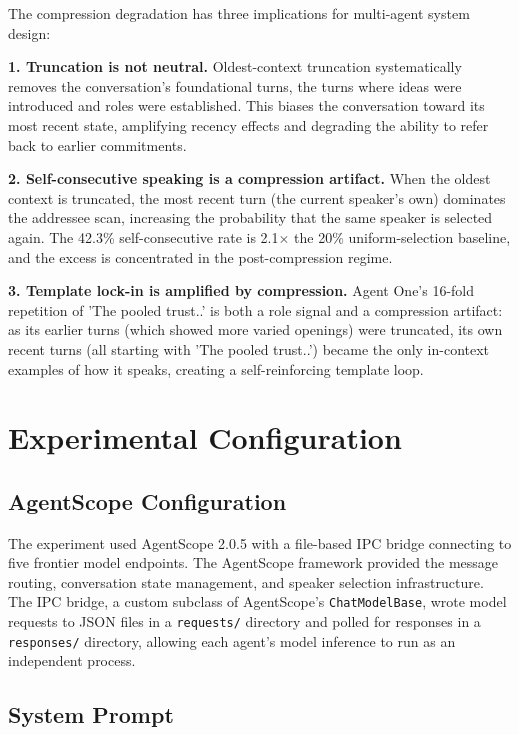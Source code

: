 \documentclass[sigconf,nonacm=true]{acmart}
\begin{document}
The compression degradation has three implications for multi-agent system design:

\textbf{1. Truncation is not neutral.} Oldest-context truncation systematically removes the conversation's foundational turns, the turns where ideas were introduced and roles were established. This biases the conversation toward its most recent state, amplifying recency effects and degrading the ability to refer back to earlier commitments.

\textbf{2. Self-consecutive speaking is a compression artifact.} When the oldest context is truncated, the most recent turn (the current speaker's own) dominates the addressee scan, increasing the probability that the same speaker is selected again. The 42.3\% self-consecutive rate is 2.1$\times$ the 20\% uniform-selection baseline, and the excess is concentrated in the post-compression regime.

\textbf{3. Template lock-in is amplified by compression.} Agent One's 16-fold repetition of 'The pooled trust..' is both a role signal and a compression artifact: as its earlier turns (which showed more varied openings) were truncated, its own recent turns (all starting with 'The pooled trust..') became the only in-context examples of how it speaks, creating a self-reinforcing template loop.

\section{Experimental Configuration}
\label{app:config}

\subsection{AgentScope Configuration}

The experiment used AgentScope 2.0.5 with a file-based IPC bridge connecting to five frontier model endpoints. The AgentScope framework provided the message routing, conversation state management, and speaker selection infrastructure. The IPC bridge, a custom subclass of AgentScope's \texttt{ChatModelBase}, wrote model requests to JSON files in a \texttt{requests/} directory and polled for responses in a \texttt{responses/} directory, allowing each agent's model inference to run as an independent process.

\subsection{System Prompt}
\end{document}
